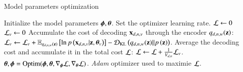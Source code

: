 \begin{algorithm} %
\caption{Model parameters optimization} %
\label{alg:optim} %
\begin{algorithmic} %
	\Require Initialize the model parameters $\boldsymbol{\phi}, \boldsymbol{\theta}$. Set the optimizer learning rate.
		\State $\mathcal{L} \leftarrow 0$
					\State $\mathcal{L}_v \leftarrow 0$
						\State Accumulate the cost of decoding $\mathbf{x}_{d,n,v}$ through the encoder $q_{d,n,w}(\mathbf{z})$:
						\State $\mathcal{L}_v \leftarrow \mathcal{L}_v + \operatorname{\mathbb{E}}_{q_{d,n,w}(\mathbf{z})}\left[\ln p\left(\mathbf{x}_{d,n,v}|\mathbf{z}, \boldsymbol{\theta}_v\right)\right] - \operatorname{\mathcal{D}_{KL}}\left(q_{d,n,w}(\mathbf{z})||p\left(\mathbf{z}\right)\right)$.
					\EndFor
					\State Average the decoding cost and accumulate it in the total cost $\mathcal{L}$:
					\State $\mathcal{L} \leftarrow \mathcal{L} + \frac{1}{V_{d,n}} \mathcal{L}_v$.
				\EndFor
			\EndFor
		\EndFor
		\State $\boldsymbol{\theta}, \boldsymbol{\phi} = \operatorname{Optim}(\boldsymbol{\phi}, \boldsymbol{\theta}, \nabla_{\boldsymbol{\phi}} \mathcal{L}, \nabla_{\boldsymbol{\theta}} \mathcal{L})$. \textit{Adam} optimizer used to maximie $\mathcal{L}$.
	\EndWhile
\end{algorithmic}
\end{algorithm}
